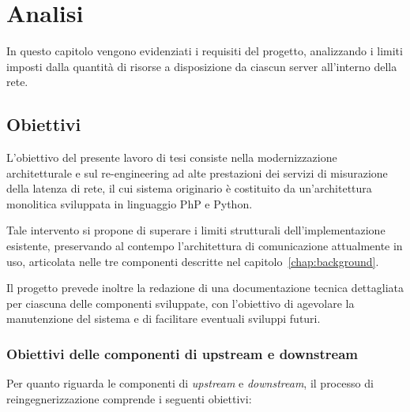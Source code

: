 \chapter{Analisi}
\label{chap:analysis}
In questo capitolo vengono evidenziati i requisiti del progetto, analizzando i limiti imposti dalla quantità di risorse a disposizione da ciascun server all'interno della rete.

\section{Obiettivi}
\label{sec:obiettivi}

L'obiettivo del presente lavoro di tesi consiste nella modernizzazione architetturale e sul re-engineering ad alte prestazioni dei servizi di misurazione della latenza di rete, il cui sistema originario è costituito da un'architettura monolitica sviluppata in linguaggio PhP e Python.

Tale intervento si propone di superare i limiti strutturali dell'implementazione esistente, preservando al contempo l'architettura di comunicazione attualmente in uso, articolata nelle tre componenti descritte nel capitolo~\ref{chap:background}.

Il progetto prevede inoltre la redazione di una documentazione tecnica dettagliata per ciascuna delle componenti sviluppate, con l'obiettivo di agevolare la manutenzione del sistema e di facilitare eventuali sviluppi futuri.

\subsection{Obiettivi delle componenti di upstream e downstream}
\label{subsec:obiettivi-upstream-downstream}

Per quanto riguarda le componenti di \emph{upstream} e \emph{downstream}, il processo di reingegnerizzazione comprende i seguenti obiettivi:

